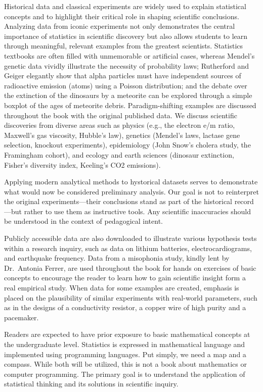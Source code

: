 \documentclass[
]{book}
\begin{document}
Historical data and classical experiments are widely used to explain statistical concepts and to highlight their critical role in shaping scientific conclusions. Analyzing data from iconic experiments not only demonstrates the central importance of statistics in scientific discovery but also allows students to learn through meaningful, relevant examples from the greatest scientists. Statistics textbooks are often filled with unmemorable or artificial cases, whereas Mendel's genetic data vividly illustrate the necessity of probability laws; Rutherford and Geiger elegantly show that alpha particles must have independent sources of radioactive emission (atoms) using a Poisson distribution; and the debate over the extinction of the dinosaurs by a meteorite can be explored through a simple boxplot of the ages of meteorite debris. Paradigm-shifting examples are discussed throughout the book with the original published data. We discuss scientific discoveries from diverse areas such as physics (e.g., the electron e/m ratio, Maxwell's gas viscosity, Hubble's law), genetics (Mendel's laws, lactase gene selection, knockout experiments), epidemiology (John Snow's cholera study, the Framingham cohort), and ecology and earth sciences (dinosaur extinction, Fisher's diversity index, Keeling's CO2 emissions).

Applying modern analytical methods to hystorical datasets serves to demonstrate what would now be considered preliminary analysis. Our goal is not to reinterpret the original experiments---their conclusions stand as part of the historical record---but rather to use them as instructive tools. Any scientific inaccuracies should be understood in the context of pedagogical intent.

Publicly accessible data are also downloaded to illustrate various hypothesis tests within a research inquiry, such as data on lithium batteries, electrocardiograms, and earthquake frequency. Data from a misophonia study, kindly lent by Dr.~Antonia Ferrer, are used throughout the book for hands on exercises of basic concepts to encourage the reader to learn how to gain scientific insight form a real empirical study. When data for some examples are created, emphasis is placed on the plausibility of similar experiments with real-world parameters, such as in the designs of a conductivity resistor, a copper wire of high purity and a pacemaker.

Readers are expected to have prior exposure to basic mathematical concepts at the undergraduate level. Statistics is expressed in mathematical language and implemented using programming languages. Put simply, we need a map and a compass. While both will be utilized, this is not a book about mathematics or computer programming. The primary goal is to understand the application of statistical thinking and its solutions in scientific inquiry.
\end{document}
